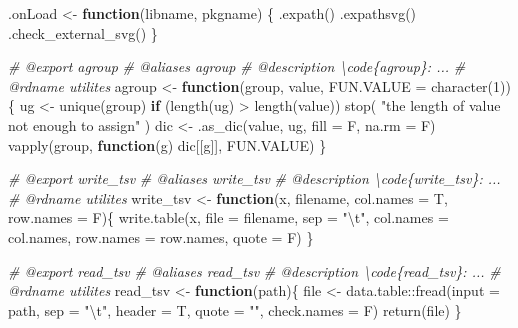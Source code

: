 \documentclass[
]{article}
\newenvironment{Shaded}{\begin{snugshade}}{\end{snugshade}}
\newcommand{\AttributeTok}[1]{\textcolor[rgb]{0.77,0.63,0.00}{#1}}
\newcommand{\CommentTok}[1]{\textcolor[rgb]{0.56,0.35,0.01}{\textit{#1}}}
\newcommand{\ControlFlowTok}[1]{\textcolor[rgb]{0.13,0.29,0.53}{\textbf{#1}}}
\newcommand{\DecValTok}[1]{\textcolor[rgb]{0.00,0.00,0.81}{#1}}
\newcommand{\FunctionTok}[1]{\textcolor[rgb]{0.00,0.00,0.00}{#1}}
\newcommand{\NormalTok}[1]{#1}
\newcommand{\OtherTok}[1]{\textcolor[rgb]{0.56,0.35,0.01}{#1}}
\newcommand{\SpecialCharTok}[1]{\textcolor[rgb]{0.00,0.00,0.00}{#1}}
\newcommand{\StringTok}[1]{\textcolor[rgb]{0.31,0.60,0.02}{#1}}
\begin{document}
\begin{Shaded}
\begin{Highlighting}[]
\NormalTok{.onLoad }\OtherTok{\textless{}{-}} \ControlFlowTok{function}\NormalTok{(libname, pkgname) \{}
  \FunctionTok{.expath}\NormalTok{()}
  \FunctionTok{.expathsvg}\NormalTok{()}
  \FunctionTok{.check\_external\_svg}\NormalTok{()}
\NormalTok{\}}

\CommentTok{\#\textquotesingle{} @export agroup}
\CommentTok{\#\textquotesingle{} @aliases agroup}
\CommentTok{\#\textquotesingle{} @description \textbackslash{}code\{agroup\}: ...}
\CommentTok{\#\textquotesingle{} @rdname utilites}
\NormalTok{agroup }\OtherTok{\textless{}{-}} \ControlFlowTok{function}\NormalTok{(group, value, }\AttributeTok{FUN.VALUE =} \FunctionTok{character}\NormalTok{(}\DecValTok{1}\NormalTok{)) \{}
\NormalTok{  ug }\OtherTok{\textless{}{-}} \FunctionTok{unique}\NormalTok{(group)}
  \ControlFlowTok{if}\NormalTok{ (}\FunctionTok{length}\NormalTok{(ug) }\SpecialCharTok{\textgreater{}} \FunctionTok{length}\NormalTok{(value))}
    \FunctionTok{stop}\NormalTok{( }\StringTok{"the length of \textquotesingle{}value\textquotesingle{} not enough to assign"}\NormalTok{ )}
\NormalTok{  dic }\OtherTok{\textless{}{-}} \FunctionTok{.as\_dic}\NormalTok{(value, ug, }\AttributeTok{fill =}\NormalTok{ F, }\AttributeTok{na.rm =}\NormalTok{ F)}
  \FunctionTok{vapply}\NormalTok{(group, }\ControlFlowTok{function}\NormalTok{(g) dic[[g]], FUN.VALUE)}
\NormalTok{\}}

\CommentTok{\#\textquotesingle{} @export write\_tsv}
\CommentTok{\#\textquotesingle{} @aliases write\_tsv}
\CommentTok{\#\textquotesingle{} @description \textbackslash{}code\{write\_tsv\}: ...}
\CommentTok{\#\textquotesingle{} @rdname utilites}
\NormalTok{write\_tsv }\OtherTok{\textless{}{-}}
  \ControlFlowTok{function}\NormalTok{(x, filename, }\AttributeTok{col.names =}\NormalTok{ T, }\AttributeTok{row.names =}\NormalTok{ F)\{}
    \FunctionTok{write.table}\NormalTok{(x, }\AttributeTok{file =}\NormalTok{ filename, }\AttributeTok{sep =} \StringTok{"}\SpecialCharTok{\textbackslash{}t}\StringTok{"}\NormalTok{,}
                \AttributeTok{col.names =}\NormalTok{ col.names, }\AttributeTok{row.names =}\NormalTok{ row.names, }\AttributeTok{quote =}\NormalTok{ F)}
\NormalTok{  \}}

\CommentTok{\#\textquotesingle{} @export read\_tsv}
\CommentTok{\#\textquotesingle{} @aliases read\_tsv}
\CommentTok{\#\textquotesingle{} @description \textbackslash{}code\{read\_tsv\}: ...}
\CommentTok{\#\textquotesingle{} @rdname utilites}
\NormalTok{read\_tsv }\OtherTok{\textless{}{-}} \ControlFlowTok{function}\NormalTok{(path)\{}
\NormalTok{  file }\OtherTok{\textless{}{-}}\NormalTok{ data.table}\SpecialCharTok{::}\FunctionTok{fread}\NormalTok{(}\AttributeTok{input =}\NormalTok{ path, }\AttributeTok{sep =} \StringTok{"}\SpecialCharTok{\textbackslash{}t}\StringTok{"}\NormalTok{,}
                            \AttributeTok{header =}\NormalTok{ T, }\AttributeTok{quote =} \StringTok{""}\NormalTok{, }\AttributeTok{check.names =}\NormalTok{ F)}
  \FunctionTok{return}\NormalTok{(file)}
\NormalTok{\}}


\end{Highlighting}
\end{Shaded}
\end{document}
